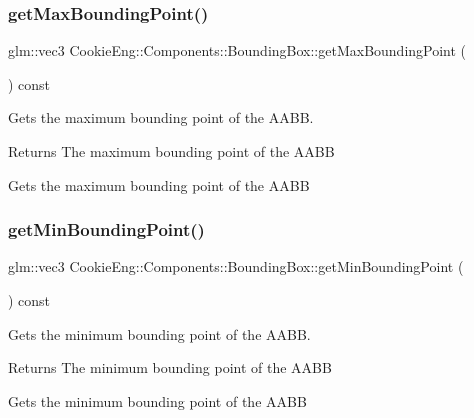 \subsubsection{\texorpdfstring{get\+Max\+Bounding\+Point()}{getMaxBoundingPoint()}}
{\footnotesize\ttfamily glm\+::vec3 Cookie\+Eng\+::\+Components\+::\+Bounding\+Box\+::get\+Max\+Bounding\+Point (\begin{DoxyParamCaption}{ }\end{DoxyParamCaption}) const\hspace{0.3cm}{\ttfamily [inline]}}



Gets the maximum bounding point of the A\+A\+BB. 

\begin{DoxyReturn}{Returns}
The maximum bounding point of the A\+A\+BB
\end{DoxyReturn}
Gets the maximum bounding point of the A\+A\+BB \mbox{\label{class_cookie_eng_1_1_components_1_1_bounding_box_ab524d90c0bf3665bec9f2f2df3d41b89}} 
\subsubsection{\texorpdfstring{get\+Min\+Bounding\+Point()}{getMinBoundingPoint()}}
{\footnotesize\ttfamily glm\+::vec3 Cookie\+Eng\+::\+Components\+::\+Bounding\+Box\+::get\+Min\+Bounding\+Point (\begin{DoxyParamCaption}{ }\end{DoxyParamCaption}) const\hspace{0.3cm}{\ttfamily [inline]}}



Gets the minimum bounding point of the A\+A\+BB. 

\begin{DoxyReturn}{Returns}
The minimum bounding point of the A\+A\+BB
\end{DoxyReturn}
Gets the minimum bounding point of the A\+A\+BB \mbox{\label{class_cookie_eng_1_1_components_1_1_bounding_box_acad51073f91813d60746832744fe23c3}} 
